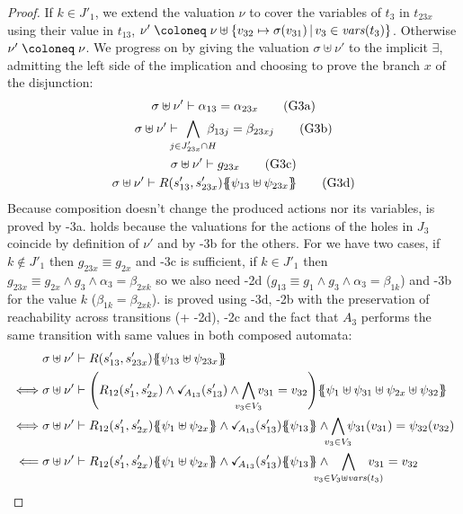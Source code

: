 \documentclass{article}
\begin{document}
\begin{proof}
	If \(k \in J'_1\), we extend the valuation \(\nu\) to cover the variables of \(t_3\) in \(t_{23x}\) using their value in \(t_{13}\), \(\nu' \defobject \nu \uplus \mset{v_{32} \mapsto \sigma\mpar{v_{31}}}{v_3 \in \fvars{t_3}}\).
	Otherwise \(\nu' \defobject \nu\).
	We progress on  by giving the valuation \(\sigma \uplus \nu'\) to the implicit \(\exists\), admitting the left side of the implication and choosing to prove the branch \(x\) of the disjunction:
	\begin{gather}
		\sigma \uplus \nu' \vdash \alpha_{13} = \alpha_{23x} \goal{3a} \\
		\sigma \uplus \nu' \vdash \bigwedge_\subbox{j \in J'_{23x} \cap H} \beta_{13j} = \beta_{23xj} \goal{3b} \\
		\sigma \uplus \nu' \vdash g_{23x} \goal{3c} \\
		\sigma \uplus \nu' \vdash R\mpar{s'_{13}, s'_{23x}}\psubst{\psi_{13} \uplus \psi_{23x}} \goal{3d}
	\end{gather}
	Because composition doesn't change the produced actions nor its variables,  is proved by \hyp{3a}.
	 holds because the valuations for the actions of the holes in \(J_3\) coincide by definition of \(\nu'\) and by \hyp{3b} for the others.
	For  we have two cases, if \(k \notin J'_1\) then \(g_{23x} \equiv g_{2x}\) and \hyp{3c} is sufficient, if \(k \in J'_1\) then \(g_{23x} \equiv g_{2x} \wedge g_3 \wedge \alpha_3 = \beta_{2xk}\) so we also need \hyp{2d} (\(g_{13} \equiv g_1 \wedge g_3 \wedge \alpha_3 = \beta_{1k}\)) and \hyp{3b} for the value \(k\) (\(\beta_{1k} = \beta_{2xk}\)).
	 is proved using \hyp{3d}, \hyp{2b} with the preservation of reachability across transitions (+ \hyp{2d}), \hyp{2c} and the fact that \(A_3\) performs the same transition with same values in both composed automata:
	\begin{align*}
		& \sigma \uplus \nu' \vdash R\mpar{s'_{13}, s'_{23x}}\psubst{\psi_{13} \uplus \psi_{23x}} \\
		\iff & \sigma \uplus \nu' \vdash \mpar{R_{12}\mpar{s'_1, s'_{2x}} \wedge \reach{A_{13}}\mpar{s'_{13}} \wedge \bigwedge_\subbox{v_3 \in V_3} v_{31} = v_{32}}\psubst{\psi_1 \uplus \psi_{31} \uplus \psi_{2x} \uplus \psi_{32}} \\
		\iff & \sigma \uplus \nu' \vdash R_{12}\mpar{s'_1, s'_{2x}}\psubst{\psi_1 \uplus \psi_{2x}} \wedge \reach{A_{13}}\mpar{s'_{13}}\psubst{\psi_{13}} \wedge \bigwedge_\subbox{v_3 \in V_3} \psi_{31}\mpar{v_{31}} = \psi_{32}\mpar{v_{32}} \\
		\impliedby & \sigma \uplus \nu' \vdash R_{12}\mpar{s'_1, s'_{2x}}\psubst{\psi_1 \uplus \psi_{2x}} \wedge \reach{A_{13}}\mpar{s'_{13}}\psubst{\psi_{13}} \wedge \bigwedge_\subbox{v_3 \in V_3 \uplus \fvars{t_3}} v_{31} = v_{32} \\

\end{align*}
\end{proof}
\end{document}
